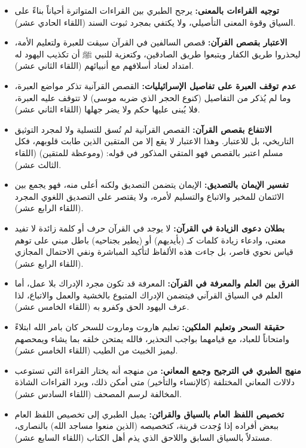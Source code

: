 \begin{itemize}
    \item \textbf{توجيه القراءات بالمعنى:} يرجح الطبري بين القراءات المتواترة أحياناً بناءً على السياق وقوة المعنى التأصيلي، ولا يكتفي بمجرد ثبوت السند (اللقاء الحادي عشر).
    \item \textbf{الاعتبار بقصص القرآن:} قصص السالفين في القرآن سيقت للعبرة ولتعليم الأمة، ليحذروا طريق الكفار ويتبعوا طريق الصادقين، وكتعزية للنبي ﷺ أن تكذيب اليهود له امتداد لعناد أسلافهم مع أنبيائهم (اللقاء الثاني عشر).
    \item \textbf{عدم توقف العبرة على تفاصيل الإسرائيليات:} القصص القرآنية تذكر مواضع العبرة، وما لم يُذكر من التفاصيل (كنوع الحجر الذي ضربه موسى) لا تتوقف عليه العبرة، فلا يُبنى عليها حكم ولا يضر جهلها (اللقاء الثاني عشر).
    \item \textbf{الانتفاع بقصص القرآن:} القصص القرآنية لم تُسق للتسلية ولا لمجرد التوثيق التاريخي، بل للاعتبار. وهذا الاعتبار لا يقع إلا من المتقين الذين طابت قلوبهم، فكل مسلم اعتبر بالقصص فهو المتقي المذكور في قوله: (وموعظة للمتقين) (اللقاء الثالث عشر).
    \item \textbf{تفسير الإيمان بالتصديق:} الإيمان يتضمن التصديق ولكنه أعلى منه، فهو يجمع بين الائتمان للمخبر والاتباع والتسليم لأمره، ولا يقتصر على التصديق اللغوي المجرد (اللقاء الرابع عشر).
    \item \textbf{بطلان دعوى الزيادة في القرآن:} لا يوجد في القرآن حرف أو كلمة زائدة لا تفيد معنى، وادعاء زيادة كلمات كـ (بأيديهم) أو (يطير بجناحيه) باطل مبني على توهم قياس نحوي قاصر، بل جاءت هذه الألفاظ لتأكيد المباشرة ونفي الاحتمال المجازي (اللقاء الرابع عشر).
    \item \textbf{الفرق بين العلم والمعرفة في القرآن:} المعرفة قد تكون مجرد الإدراك بلا عمل، أما العلم في السياق القرآني فيتضمن الإدراك المتبوع بالخشية والعمل والاتباع، لذا عرف اليهود الحق وكفرو به (اللقاء الخامس عشر).
    \item \textbf{حقيقة السحر وتعليم الملكين:} تعليم هاروت وماروت للسحر كان بامر الله ابتلاءً وامتحاناً للعباد، مع قيامهما بواجب التحذير، فالله يمتحن خلقه بما يشاء ويمحصهم ليميز الخبيث من الطيب (اللقاء الخامس عشر).
    \item \textbf{منهج الطبري في الترجيح وجمع المعاني:} من منهجه أنه يختار القراءة التي تستوعب دلالات المعاني المختلفة (كالإنساء والتأخير) متى أمكن ذلك، ويرد القراءات الشاذة المخالفة لرسم المصحف (اللقاء السادس عشر).
    \item \textbf{تخصيص اللفظ العام بالسياق والقرائن:} يميل الطبري إلى تخصيص اللفظ العام ببعض أفراده إذا وُجدت قرينة، كتخصيصه (الذين منعوا مساجد الله) بالنصارى، مستدلاً بالسياق السابق واللاحق الذي يذم أهل الكتاب (اللقاء السابع عشر).

\end{itemize}
